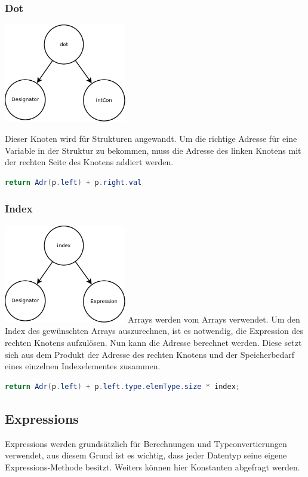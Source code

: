 \subsubsection{Dot}
\includegraphics[width=0.4\textwidth]{./media/images/interpreter/syntaxbaum/designators/dot.png}

Dieser Knoten wird für Strukturen angewandt. Um die richtige Adresse für eine Variable in der Struktur zu bekommen, muss die Adresse des linken
Knotens mit der rechten Seite des Knotens addiert werden.

\begin{lstlisting}[language=JAVA]
return Adr(p.left) + p.right.val
\end{lstlisting}

\subsubsection{Index}
\includegraphics[width=0.4\textwidth]{./media/images/interpreter/syntaxbaum/designators/index.png}
Arrays werden vom Arrays verwendet. Um den Index des gewünschten Arrays auszurechnen, ist es notwendig, die Expression des rechten Knotens aufzulösen.
Nun kann die Adresse berechnet werden. Diese setzt sich aus dem Produkt der Adresse des rechten Knotens und der  Speicherbedarf eines einzelnen Indexelementes zusammen.

\begin{lstlisting}[language=JAVA]
return Adr(p.left) + p.left.type.elemType.size * index;
\end{lstlisting}

\subsection{Expressions}
Expressions werden grundsätzlich für Berechnungen und Typconvertierungen verwendet, aus diesem Grund ist es wichtig, dass jeder Datentyp seine eigene Expressions-Methode besitzt. Weiters können hier Konstanten abgefragt werden.


